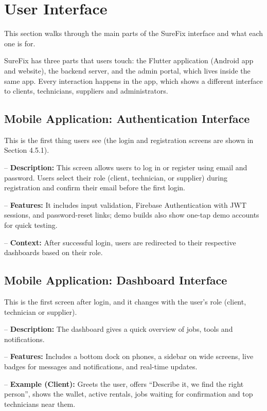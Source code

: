 \documentclass[A4paper,12pt]{report}
\theoremstyle{plain}
\theoremstyle{definition}
\theoremstyle{remark}
\numberwithin{equation}{section}
\begin{document}
\section{User Interface}

This section walks through the main parts of the SureFix interface and what each one is for.

SureFix has three parts that users touch: the Flutter application (Android app and website), the backend server, and the admin portal, which lives inside the same app. Every interaction happens in the app, which shows a different interface to clients, technicians, suppliers and administrators.

\subsection{Mobile Application: Authentication Interface}

This is the first thing users see (the login and registration screens are shown in Section 4.5.1).

-- \textbf{Description:} This screen allows users to log in or register using email and password. Users select their role (client, technician, or supplier) during registration and confirm their email before the first login.

-- \textbf{Features:} It includes input validation, Firebase Authentication with JWT sessions, and password-reset links; demo builds also show one-tap demo accounts for quick testing.

-- \textbf{Context:} After successful login, users are redirected to their respective dashboards based on their role.

\subsection{Mobile Application: Dashboard Interface}

This is the first screen after login, and it changes with the user's role (client, technician or supplier).

-- \textbf{Description:} The dashboard gives a quick overview of jobs, tools and notifications.

-- \textbf{Features:} Includes a bottom dock on phones, a sidebar on wide screens, live badges for messages and notifications, and real-time updates.

-- \textbf{Example (Client):} Greets the user, offers ``Describe it, we find the right person'', shows the wallet, active rentals, jobs waiting for confirmation and top technicians near them.
\end{document}

